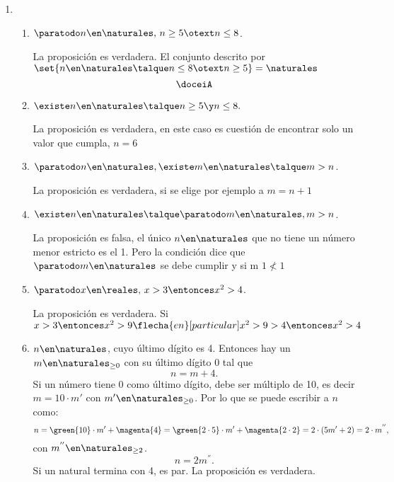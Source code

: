 \begin{enumerate}[label=\roman*)]
  \item
        \begin{enumerate}[label=\alph*)]
          \item $\paratodo n \en \naturales,\, n \geq 5 \otext n \leq 8$.

                La proposición es verdadera. El conjunto descrito por $\set{ n \en \naturales \talque n \leq 8 \otext n \geq 5} = \naturales$
                $$
                  \doceiA
                $$

          \item $\existe n \en \naturales \talque n \geq 5 \y n\leq 8.$\par
                La proposición es verdadera, en este caso es cuestión de encontrar solo un valor que cumpla, $n = 6$

          \item $\paratodo n \en \naturales, \existe m \en \naturales \talque m > n$.\par
                La proposición es verdadera, si se elige por ejemplo a $m = n+1$

          \item $\existe n \en \naturales \talque \paratodo m \en \naturales, m >n$.\par
                La proposición es falsa, el único $n \en \naturales$ que no tiene un número menor estricto es el 1. Pero la condición
                dice que $\paratodo m \en \naturales$ se debe cumplir y si m $1 \nless 1$

          \item $\paratodo x \en \reales,\, x > 3 \entonces x^2 > 4$.\par
                La proposición es verdadera. Si $x > 3 \entonces x^2 > 9 \flecha{en}[particular] x^2 > 9 > 4 \entonces x^2 > 4$

          \item $n \en \naturales$, cuyo último dígito es 4. Entonces hay un $m \en \naturales_{\geq 0}$ con su último dígito 0 tal que
                $$
                  n = m + 4.
                $$
                Si un número tiene 0 como último dígito, debe ser múltiplo de 10, es decir
                $m = 10 \cdot m'$ con $m' \en \naturales_{\geq 0} $. Por lo que se puede escribir a $n$ como:
                $$
                  n = \green{10} \cdot m' + \magenta{4} =
                  \green{2 \cdot 5} \cdot m' + \magenta{2 \cdot 2} =
                  2 \cdot (5 m' + 2) =
                  2 \cdot m^{''},
                $$ con $m^{''} \en \naturales_{\geq 2}$.
                $$
                  n = 2m^{''}.
                $$
                Si un natural termina con 4, es par. La proposición es verdadera.


\end{enumerate}
\end{enumerate}
